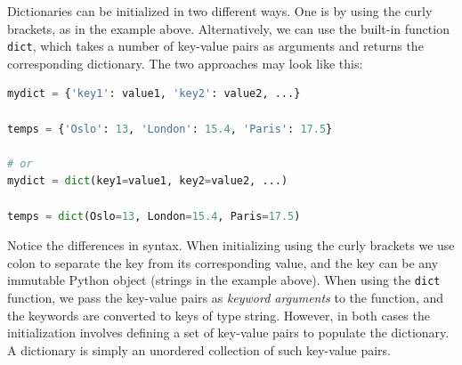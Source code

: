 \documentclass[graybox,envcountchap,sectrefs,final]{svmonodo}
\begin{document}
Dictionaries can be initialized in two different ways. One is by using the curly brackets, as in the example
above. Alternatively, we can use the built-in function \texttt{dict}, which takes a number of key-value pairs as
arguments and returns the corresponding dictionary. The two approaches may look like this:
\begin{lstlisting}[language=Python,style=blue1]
mydict = {'key1': value1, 'key2': value2, ...}

temps = {'Oslo': 13, 'London': 15.4, 'Paris': 17.5}

# or
mydict = dict(key1=value1, key2=value2, ...)

temps = dict(Oslo=13, London=15.4, Paris=17.5)
\end{lstlisting}
Notice the differences in syntax. When initializing using the curly brackets we
use colon to separate the key from its corresponding value, and the key can be any immutable Python object
(strings in the example above). When using the \texttt{dict} function, we pass the key-value pairs as \emph{keyword arguments}
to the function,
and the keywords are converted to keys of type string. However, in both cases the initialization involves defining
a set of key-value pairs to populate the dictionary. A dictionary is simply an unordered collection of such
key-value pairs.
\end{document}
